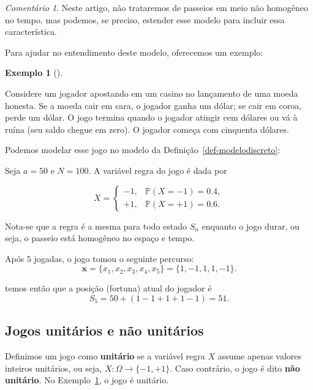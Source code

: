 \documentclass[
  brazilian,
  12pt,
]{article}
\theoremstyle{definition}
\newtheorem{example}{Exemplo}[section]
\theoremstyle{definition}
\theoremstyle{remark}
\newtheorem{refremark}{Comentário}[section]
\begin{document}
\begin{refremark}
Neste artigo, não trataremos de passeios em meio não homogêneo no tempo,
mas podemos, se preciso, estender esse modelo para incluir essa
característica.

\label{rem-tempo}

\end{refremark}

Para ajudar no entendimento deste modelo, oferecemos um exemplo:

\begin{example}[]\protect\hypertarget{exm-modelodiscreto}{}\label{exm-modelodiscreto}

Considere um jogador apostando em um casino no lançamento de uma moeda
honesta. Se a moeda cair em cara, o jogador ganha um dólar; se cair em
coroa, perde um dólar. O jogo termina quando o jogador atingir cem
dólares ou vá à ruína (seu saldo chegue em zero). O jogador começa com
cinquenta dólares.

Podemos modelar esse jogo no modelo da
Definição~\ref{def-modelodiscreto}:

Seja \(a = 50\) e \(N = 100\). A variável regra do jogo é dada por

\[
X = \begin{cases}
-1, & \mathbb{P}(X = -1) = 0.4, \\
+1, & \mathbb{P}(X = +1) = 0.6.
\end{cases}
\]

Nota-se que a regra é a mesma para todo estado \(S_n\) enquanto o jogo
durar, ou seja, o passeio está homogêneo no espaço e tempo.

Após \(5\) jogadas, o jogo tomou o seguinte percurso: \[
\pmb{x} = \{x_1, x_2, x_3, x_4, x_5\} = \{1, -1, 1, 1, -1\}.
\]

temos então que a posição (fortuna) atual do jogador é \[
S_5 = 50 + (1 - 1 + 1 + 1 -1) = 51.
\]

\end{example}

\subsection{Jogos unitários e não
unitários}\label{jogos-unituxe1rios-e-nuxe3o-unituxe1rios}

Definimos um jogo como \textbf{unitário} se a variável regra \(X\)
assume apenas valores inteiros unitários, ou seja,
\(X: \Omega \rightarrow \{-1, +1\}\). Caso contrário, o jogo é dito
\textbf{não unitário}. No Exemplo~\ref{exm-modelodiscreto}, o jogo é
unitário.
\end{document}
